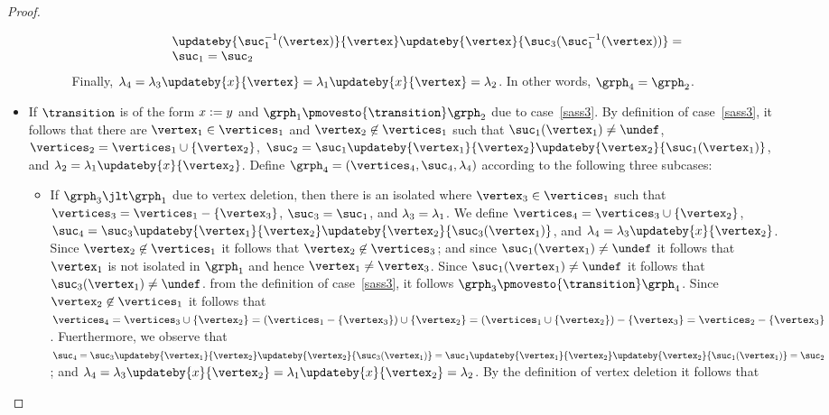 \begin{proof}
\begin{itemize}
\begin{itemize}
\begin{itemize}
\[\begin{array}{l}
\updateby{\suc_1^{-1}(\vertex)}{\vertex}\updateby{\vertex}{\suc_3(\suc_1^{-1}(\vertex))}
=\\
\suc_1=\suc_2
\end{array}
\]
Finally, $\labeling_4=\labeling_3\updateby{\xvar}{\vertex}
=\labeling_1\updateby{\xvar}{\vertex}=\labeling_2
$.
In other words, $\grph_4=\grph_2$.
\end{itemize}
\end{itemize}
\item
If $\transition$ is of the form $x:=y$ and 
$\grph_1\pmovesto{\transition}\grph_2$ due to case~\ref{sass3}.
%
By definition of case~\ref{sass3}, it follows 
that there are $\vertex_1\in\vertices_1$ and $\vertex_2\not\in\vertices_1$ such that
$\suc_1(\vertex_1)\neq\undef$,
$\vertices_2=\vertices_1\cup\set{\vertex_2}$,
$\suc_2=\suc_1\updateby{\vertex_1}{\vertex_2}\updateby{\vertex_2}{\suc_1(\vertex_1)}$, and
$\labeling_2=\labeling_1\updateby{\xvar}{\vertex_2}$.
%
Define $\grph_4=\tuple{\vertices_4,\suc_4,\labeling_4}$ according to the following
three subcases:
%
\begin{itemize}
\item
If $\grph_3\jlt\grph_1$ due to vertex deletion, then
there is an isolated where $\vertex_3\in\vertices_1$ such that 
$\vertices_3=\vertices_1-\set{\vertex_3}$, 
$\suc_3=\suc_1$, and $\lambda_3=\lambda_1$.
%
We define 
$\vertices_4=\vertices_3\cup\set{\vertex_2}$,
$\suc_4=\suc_3\updateby{\vertex_1}{\vertex_2}\updateby{\vertex_2}{\suc_3(\vertex_1)}$, and
$\labeling_4=\labeling_3\updateby{\xvar}{\vertex_2}$.
%
Since $\vertex_2\not\in\vertices_1$  it follows that $\vertex_2\not\in\vertices_3$; and
since $\suc_1(\vertex_1)\neq\undef$ it follows that $\vertex_1$ is not isolated in $\grph_1$
and hence $\vertex_1\neq\vertex_3$.
%
Since $\suc_1(\vertex_1)\neq\undef$ 
it follows that 
$\suc_3(\vertex_1)\neq\undef$.
%
from the definition of case~\ref{sass3}, it follows
$\grph_3\pmovesto{\transition}\grph_4$.
%
Since $\vertex_2\not\in\vertices_1$
it follows that
$\vertices_4=
\vertices_3\cup\set{\vertex_2}=
(\vertices_1-\set{\vertex_3})\cup\set{\vertex_2}=
(\vertices_1\cup\set{\vertex_2})-\set{\vertex_3}=
\vertices_2-\set{\vertex_3}
$.
Fuerthermore, we observe that
$\suc_4=
\suc_3\updateby{\vertex_1}{\vertex_2}\updateby{\vertex_2}{\suc_3(\vertex_1)}=
\suc_1\updateby{\vertex_1}{\vertex_2}\updateby{\vertex_2}{\suc_1(\vertex_1)}=
\suc_2$; and
$\labeling_4=
\labeling_3\updateby{\xvar}{\vertex_2}=
\labeling_1\updateby{\xvar}{\vertex_2}=
\labeling_2$.
%
By the definition of vertex deletion it follows that

\end{itemize}
\end{itemize}
\end{proof}
